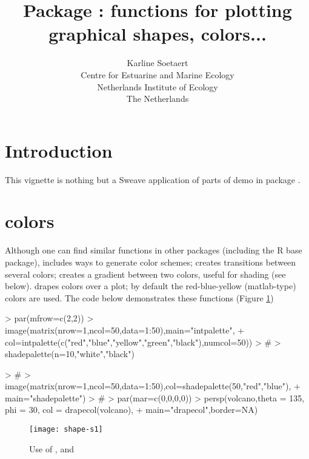 \documentclass[article,nojss]{jss}
\title{\proglang{R} Package \pkg{shape}: functions for plotting graphical shapes, colors...}
\author{Karline Soetaert\\
Centre for Estuarine and Marine Ecology\\
Netherlands Institute of Ecology\\
The Netherlands
}
\begin{document}
\maketitle

\section{Introduction}

This vignette is nothing but a Sweave application of parts of demo  in package
.


\section{colors}
Although one can find similar functions in other packages (including the R base package),
 includes ways to generate color schemes;  creates transitions
between several colors;  creates a gradient between two colors,
useful for shading (see below).  drapes colors over a  plot;
by default the red-blue-yellow (matlab-type) colors are used. The code below demonstrates
these functions (Figure \ref{fig:s1})
\begin{Schunk}
\begin{Sinput}
> par(mfrow=c(2,2))
> image(matrix(nrow=1,ncol=50,data=1:50),main="intpalette",
+       col=intpalette(c("red","blue","yellow","green","black"),numcol=50))
> #
> shadepalette(n=10,"white","black")
\end{Sinput}
\begin{Sinput}
> #
> image(matrix(nrow=1,ncol=50,data=1:50),col=shadepalette(50,"red","blue"),
+        main="shadepalette")
> #
> par(mar=c(0,0,0,0))
> persp(volcano,theta = 135, phi = 30, col = drapecol(volcano),
+        main="drapecol",border=NA)
\end{Sinput}
\end{Schunk}
\begin{figure}
\begin{center}
\begin{Schunk}
\end{Schunk}
\texttt{[image: shape-s1]}
\end{center}
\caption{Use of ,  and }
\label{fig:s1}
\end{figure}
\end{document}
